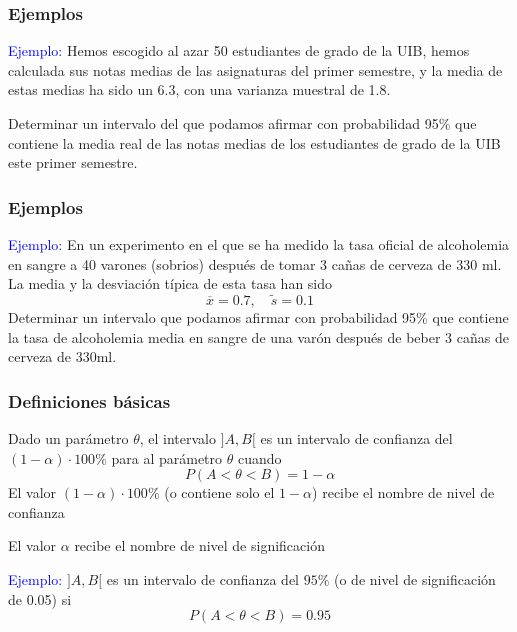 \documentclass[12pt,t]{beamer}\usepackage[]{graphicx}\usepackage[]{color}
\newcommand{\blue}[1]{\textcolor{blue}{#1}}
\renewcommand{\emph}[1]{{\color{red}#1}}
\theoremstyle{plain}
\theoremstyle{definition}
\begin{document}
\begin{frame}
\frametitle{Ejemplos}


\blue{Ejemplo:} 
Hemos escogido al azar 50 estudiantes de grado de la UIB, hemos calculada sus notas medias de las asignaturas del primer semestre, y la media de estas medias ha sido un 6.3, con una varianza muestral de 1.8.\medskip

Determinar un intervalo del que podamos afirmar con probabilidad 95\% que contiene la media real de las notas medias de los estudiantes de grado de la UIB este primer semestre.
\end{frame}


\begin{frame}
\frametitle{Ejemplos}

\blue{Ejemplo:} En un experimento en el que se ha medido la tasa oficial  de  alcoholemia en sangre a 40 varones (sobrios) después de tomar 3 cañas de cerveza de 330 ml.
La media y la desviación típica de esta tasa han sido
$$
\overline{x}=0.7,\quad \widetilde{s}=0.1
$$
Determinar un intervalo que podamos afirmar con probabilidad 95\% que contiene la tasa de alcoholemia media en sangre de una varón  después de beber 3  cañas de cerveza de 330ml.
\end{frame}




\begin{frame}
\frametitle{Definiciones básicas}

Dado un parámetro $\theta$, el intervalo $]A,B[$ es un \emph{intervalo de confianza} del
$(1-\alpha)\cdot 100\% $ para al parámetro $\theta$ cuando
$$
P(A<\theta<B)=1-\alpha
$$
El valor $(1-\alpha)\cdot 100\% $ (o contiene solo el $1-\alpha$) recibe el nombre de \emph{nivel de confianza} 
\medskip

El valor $\alpha$ recibe el nombre de \emph{nivel de significación}
\medskip 


\blue{Ejemplo:} $]A,B[$ es un intervalo de confianza del $95\%$ (o de nivel de significación de 0.05) si
$$
P(A<\theta<B)=0.95
$$
\end{frame}
\end{document}
